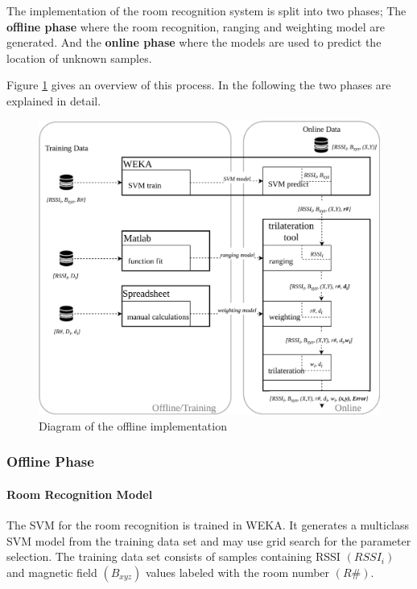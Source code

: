 The implementation of the room recognition system is split into two phases; The \textbf{offline phase} where the  room recognition, ranging and weighting model are generated. And the \textbf{online phase} where the models are used to predict the location of unknown samples.
 
Figure \ref{fig:offlineImplementation} gives an overview of this process. In the following the two phases are explained in detail.

\begin{figure}[ht]
\centering
\includegraphics[width=\textwidth]{Figures/Offline_Set-Up}
\decoRule
\caption[Test bed offline implementation]{Diagram of the offline implementation}
\label{fig:offlineImplementation}
\end{figure}

\subsubsection{Offline Phase}

\paragraph{Room Recognition Model}
The SVM for the room recognition is trained in WEKA. It generates a multiclass SVM model from the training data set and may use grid search for the parameter selection. The training data set consists of samples containing RSSI \((RSSI_{i})\) and magnetic field \((B_{xyz})\) values labeled with the room number \((R\#)\).

